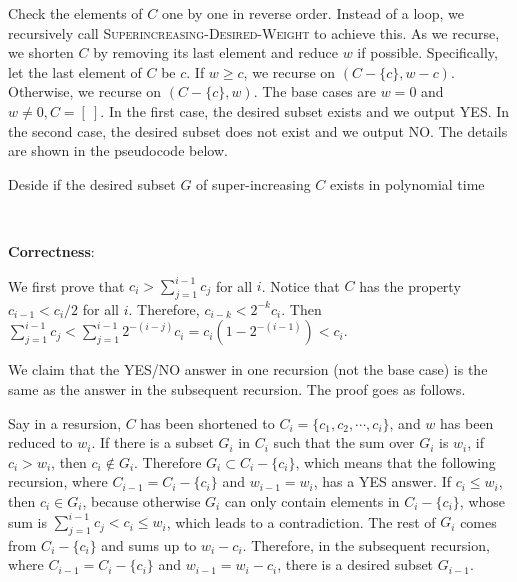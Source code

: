 \documentclass{article}
\begin{document}
Check the elements of $C$ one by one in reverse order. Instead of a loop, we recursively call \textsc{Superincreasing-Desired-Weight} to achieve this. As we recurse, we shorten $C$ by removing its last element and reduce $w$ if possible. Specifically, let the last element of $C$ be $c$. If $w\geqslant c$, we recurse on $(C-\{c\},w-c)$. Otherwise, we recurse on $(C-\{c\},w)$. The base cases are $w=0$ and $w\neq0,C=[~]$. In the first case, the desired subset exists and we output YES. In the second case, the desired subset does not exist and we output NO. The details are shown in the pseudocode below.
\begin{algorithm}
\caption{Deside if the desired subset $G$ of super-increasing $C$ exists in polynomial time}
\begin{algorithmic}[1]
 
 
\Else{}
	 {\Return{}}
	\Else{} {\Return{}}
	\EndIf
\EndIf
\EndProcedure
\end{algorithmic}
\end{algorithm}

~

\noindent\textbf{Correctness}:


We first prove that $c_i>\sum_{j=1}^{i-1}c_j$ for all $i$. Notice that $C$ has the property $c_{i-1}<c_i/2$ for all $i$. Therefore, $c_{i-k}<2^{-k}c_i$. Then $\sum_{j=1}^{i-1}c_j<\sum_{j=1}^{i-1}2^{-(i-j)}c_i=c_i(1-2^{-(i-1)})<c_i$.

We claim that the YES/NO answer in one recursion (not the base case) is the same as the answer in the subsequent recursion. The proof goes as follows.

Say in a resursion, $C$ has been shortened to $C_i=\{c_1,c_2,\cdots,c_i\}$, and $w$ has been reduced to $w_i$. If there is a subset $G_i$ in $C_i$ such that the sum over $G_i$ is $w_i$, if $c_i>w_i$, then $c_i\notin G_i$. Therefore $G_i\subset C_i-\{c_i\}$, which means that the following recursion, where $C_{i-1}=C_i-\{c_i\}$ and $w_{i-1}=w_i$, has a YES answer. If $c_i\leqslant w_i$, then $c_i\in G_i$, because otherwise $G_i$ can only contain elements in $C_i-\{c_i\}$, whose sum is $\sum_{j=1}^{i-1}c_j<c_i\leqslant w_i$, which leads to a contradiction. The rest of $G_i$ comes from $C_i-\{c_i\}$ and sums up to $w_i-c_i$. Therefore, in the subsequent recursion, where $C_{i-1}=C_i-\{c_i\}$ and $w_{i-1}=w_i-c_i$, there is a desired subset $G_{i-1}$.
\end{document}
